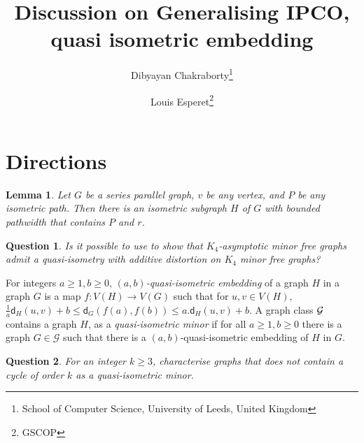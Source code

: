 \documentclass[a4paper]{article}
\title{Discussion on Generalising IPCO, quasi isometric embedding}
\author{Dibyayan Chakraborty\footnote{School of Computer Science, University of Leeds, United Kingdom}
 \and Louis Esperet\footnote{GSCOP}}
\date{}
\newcommand{\distG}[3]{\mathsf{d}_{#1}\left(#2,#3\right)}
\newtheorem{Question}{Question}
\newtheorem{lemma}{Lemma}
\begin{document}
\maketitle

\section{Directions}
 
 \newcommand{\quasipath}[2]{(#1,#2)\text{-path}\xspace}
 \begin{lemma}\label{lem:series-parallel}
 	Let $G$ be a series parallel graph, $v$ be any vertex, and $P$ be any isometric path. Then there is an isometric subgraph $H$ of $G$ with bounded pathwidth that contains $P$ and $r$.
 \end{lemma}
 
 \begin{Question}
 	Is it possible to use  to show that $K_4$-asymptotic minor free graphs admit a quasi-isometry with additive distortion on $K_4$ minor free graphs?
 \end{Question}
 
 For integers $a\geq 1,b\geq 0$, \emph{$(a,b)$-quasi-isometric embedding} of a graph $H$ in a graph $G$ is a map $f\colon V(H)\rightarrow V(G)$ such that for  $u,v\in V(H)$, $\frac{1}{a}\distG{H}{u}{v}+b\leq \distG{G}{f(a)}{f(b)} \leq a.\distG{H}{u}{v}+b$.
 A graph class $\cal G$ contains a graph $H$, as a \emph{quasi-isometric minor} if for all $a\geq 1,b\geq 0$ there is a graph $G\in \mathcal{G}$ such that there is a  $(a,b)$-quasi-isometric embedding of $H$ in $G$. 
 
 \begin{Question}
 	For an integer $k\geq 3$, characterise graphs that does not contain a cycle of order $k$ as a quasi-isometric minor.
 \end{Question}
 
\end{document}
